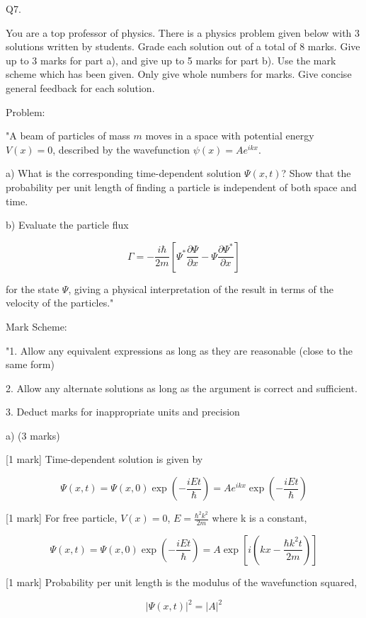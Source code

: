                            Q7. 

You are a top professor of physics. There is a physics problem given below with 3 solutions written by students. Grade each solution out of a total of 8 marks. Give up to 3 marks for part a), and give up to 5 marks for part b). Use the mark scheme which has been given. Only give whole numbers for marks. Give concise general feedback for each solution. 

Problem:

"A beam of particles of mass \( m \) moves in a space with potential energy \( V(x) = 0 \), described by the wavefunction \( \psi(x) = Ae^{ikx} \).

a) What is the corresponding time-dependent solution \( \Psi(x,t) \)? Show that the probability per unit length of finding a particle is independent of both space and time.

b) Evaluate the particle flux 

\[ \Gamma = -\frac{i\hbar}{2m}\left[ \Psi^{*}\frac{\partial\Psi}{\partial x} - \Psi\frac{\partial\Psi^{*}}{\partial x} \right] \]

for the state \( \Psi \), giving a physical interpretation of the result in terms of the velocity of the particles."

Mark Scheme:

"1. Allow any equivalent expressions as long as they are reasonable (close to the same form)

2. Allow any alternate solutions as long as the argument is correct and sufficient. 

3. Deduct marks for inappropriate units and precision

a) (3 marks)

[1 mark] Time-dependent solution is given by 

\[ \Psi(x,t) = \Psi(x,0) \exp(- \frac{iEt}{\hbar}) =  Ae^{ikx} \exp(- \frac{iEt}{\hbar})  \]

[1 mark] For free particle, \( V(x) = 0 \), \( E = \frac{\hbar^2 k^2}{2m} \) where k is a constant, 

\[ \Psi(x,t) = \Psi(x,0) \exp(- \frac{iEt}{\hbar}) =  A \exp\left[ i \left( kx - \frac{\hbar k^2 t}{2m} \right) \right] \]

[1 mark] Probability per unit length is the modulus of the wavefunction squared,

\[ |\Psi(x,t)|^2 = |A|^2 \]

